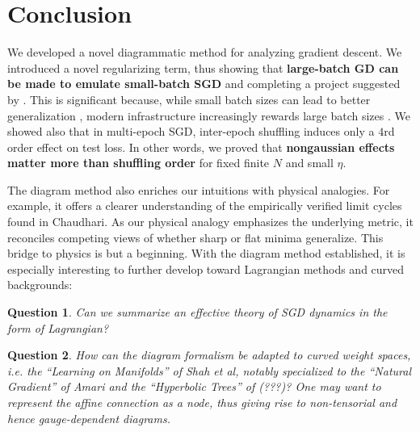 \documentclass{article}
\newtheorem{quest}{Question}
\begin{document}

\section{Conclusion}


    We developed a novel diagrammatic method for analyzing gradient descent.
    We introduced a novel regularizing term, thus showing that {\bf large-batch
    GD can be made to emulate small-batch SGD} and completing a project
    suggested by \citet{ro18}.  This is significant because, while small batch
    sizes can lead to better generalization \citep{bo91}, modern infrastructure
    increasingly rewards large batch sizes \citep{go18}.  We showed also that
    in multi-epoch SGD, inter-epoch shuffling induces only a $4$rd order effect
    on test loss.  In other words, we proved that {\bf nongaussian effects
    matter more than shuffling order} for fixed finite $N$ and small $\eta$.


    The diagram method also enriches our intuitions with physical analogies.
    For example, it offers a clearer understanding of the empirically verified
    limit cycles found in Chaudhari.  As our physical analogy emphasizes the
    underlying metric, it reconciles competing views of whether sharp or flat
    minima generalize.  This bridge to physics is but a beginning.  With the
    diagram method established, it is especially interesting to further develop
    toward Lagrangian methods and curved backgrounds: 
    \begin{quest}
        Can we summarize an effective theory of SGD dynamics in the form of 
        Lagrangian?  
    \end{quest}
    \begin{quest}
        How can the diagram formalism be adapted to curved weight spaces, i.e.
        the ``Learning on Manifolds'' of Shah et al, notably specialized to the  
        ``Natural Gradient'' of Amari and the ``Hyperbolic Trees'' of (???)?
        One may want to represent the affine connection as a node, thus giving
        rise to non-tensorial and hence gauge-dependent diagrams.
    \end{quest}
\end{document}
